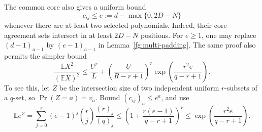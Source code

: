The common core also gives a uniform bound
\begin{equation}\label{fg:outside-pair-cap}
 c_{ij}\le e:=d-\max\{0,2D-N\}
\end{equation}
whenever there are at least two selected polynomials. Indeed, their
core agreement sets intersect in at least $2D-N$ positions.
For $e\ge1$, one may replace $(d-1)_{a-1}$ by $(e-1)_{a-1}$
in Lemma~\ref{fg:multi-padding}. The same proof also permits the simpler bound
\begin{equation}\label{fg:multi-simple}
 \frac{\mathbb EX^2}{(\mathbb EX)^2}
 \le\frac{U^r}{L}
 +\left(\frac{U}{R-r+1}\right)^r
       \exp\!\left(\frac{r^2e}{q-r+1}\right).
\end{equation}
To see this, let $Z$ be the intersection size of two independent
uniform $r$-subsets of a $q$-set, so $\Pr(Z=a)=v_a$.
Bound $(c_{ij})_a\le e^a$, and use
\[
 \mathbb E e^Z
 =\sum_{j=0}^r(e-1)^j\binom rj\frac{(r)_j}{(q)_j}
 \le\left(1+\frac{r(e-1)}{q-r+1}\right)^r
 \le\exp\!\left(\frac{r^2e}{q-r+1}\right).
\]

